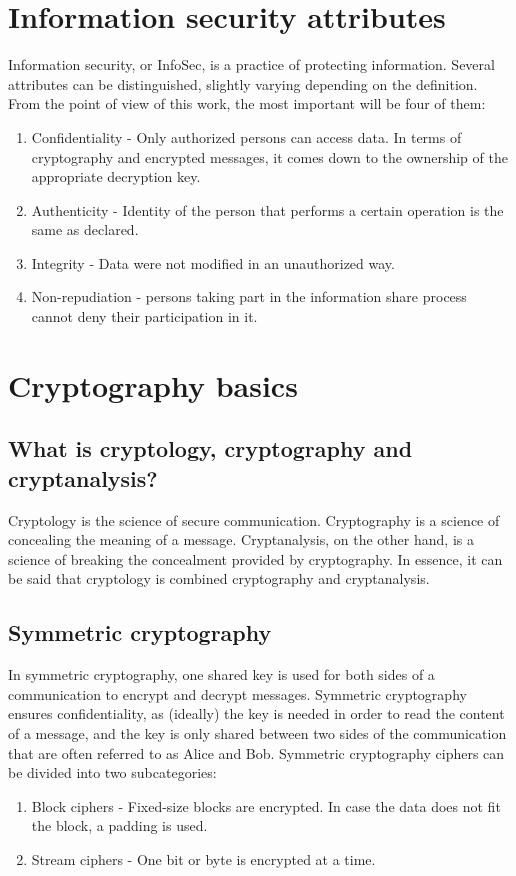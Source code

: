 \section{Information security attributes}
Information security, or InfoSec, is a practice of protecting information. Several attributes can be distinguished, slightly varying depending on the definition. From the point of view of this work, the most important will be four of them:
\begin{enumerate}
    \item Confidentiality - Only authorized persons can access data. In terms of cryptography and encrypted messages, it comes down to the ownership of the appropriate decryption key.
    \item Authenticity - Identity of the person that performs a certain operation is the same as declared.
    \item Integrity - Data were not modified in an unauthorized way.
    \item Non-repudiation - persons taking part in the information share process cannot deny their participation in it.
\end{enumerate}


\section{Cryptography basics}

\subsection{What is cryptology, cryptography and cryptanalysis?}
Cryptology is the science of secure communication. Cryptography is a science of concealing the meaning of a message. Cryptanalysis, on the other hand, is a science of breaking the concealment provided by cryptography. In essence, it can be said that cryptology is combined cryptography and cryptanalysis.

\subsection{Symmetric cryptography}
In symmetric cryptography, one shared key is used for both sides of a communication to encrypt and decrypt messages. Symmetric cryptography ensures confidentiality, as (ideally) the key is needed in order to read the content of a message, and the key is only shared between two sides of the communication that are often referred to as Alice and Bob. Symmetric cryptography ciphers can be divided into two subcategories:
\begin{enumerate}
    \item Block ciphers - Fixed-size blocks are encrypted. In case the data does not fit the block, a padding is used.
    \item Stream ciphers - One bit or byte is encrypted at a time.
\end{enumerate}

